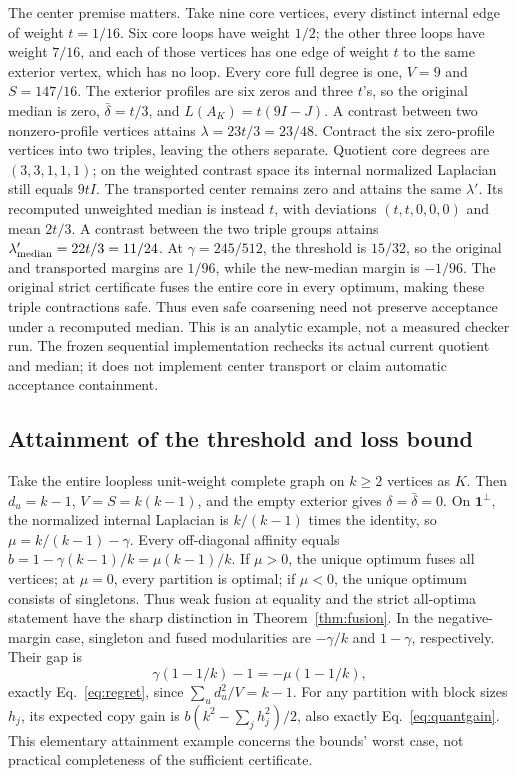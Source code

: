 \documentclass[sigconf,anonymous,review]{acmart}
\newcommand{\1}{\mathbf{1}}
\begin{document}
The center premise matters. Take nine core vertices, every distinct internal
edge of weight $t=1/16$. Six core loops have weight $1/2$; the other three
loops have weight $7/16$, and each of those vertices has one edge of weight $t$
to the same exterior vertex, which has no loop. Every core full degree is one,
$V=9$ and $S=147/16$. The exterior profiles are six zeros and three $t$'s,
so the original median is zero, $\bar\delta=t/3$, and
$L(A_K)=t(9I-J)$. A contrast between two nonzero-profile vertices attains
$\lambda=23t/3=23/48$.
Contract the six zero-profile vertices into two triples, leaving the others
separate. Quotient core degrees are $(3,3,1,1,1)$; on the weighted contrast
space its internal normalized Laplacian still equals $9tI$.
The transported center remains zero and attains the same $\lambda'$.
Its recomputed unweighted median is instead $t$, with deviations
$(t,t,0,0,0)$ and mean $2t/3$. A contrast between the two triple groups
attains $\lambda'_{\rm median}=22t/3=11/24$.
At $\gamma=245/512$, the threshold is $15/32$, so the original and transported
margins are $1/96$, while the new-median margin is $-1/96$.
The original strict certificate fuses the entire core in every optimum, making
these triple contractions safe. Thus even safe coarsening need not preserve
acceptance under a recomputed median. This is an analytic example, not a
measured checker run. The frozen sequential implementation rechecks its actual
current quotient and median; it does not implement center transport or claim
automatic acceptance containment.

\subsection{Attainment of the threshold and loss bound}\label{app:sharpness}
Take the entire loopless unit-weight complete graph on $k\ge2$ vertices as $K$.
Then $d_u=k-1$, $V=S=k(k-1)$, and the empty exterior gives
$\delta=\bar\delta=0$. On $\1^\perp$, the normalized internal Laplacian
is $k/(k-1)$ times the identity, so $\mu=k/(k-1)-\gamma$.
Every off-diagonal affinity equals
$b=1-\gamma(k-1)/k=\mu(k-1)/k$.
If $\mu>0$, the unique optimum fuses all vertices; at $\mu=0$, every
partition is optimal; if $\mu<0$, the unique optimum consists of singletons.
Thus weak fusion at equality and the strict all-optima statement have the
sharp distinction in Theorem~\ref{thm:fusion}.
In the negative-margin case, singleton and fused modularities are
$-\gamma/k$ and $1-\gamma$, respectively. Their gap is
\[
 \gamma(1-1/k)-1=-\mu(1-1/k),
\]
exactly Eq.~\eqref{eq:regret}, since
$\sum_ud_u^2/V=k-1$.
For any partition with block sizes $h_j$, its expected copy gain is
$b(k^2-\sum_jh_j^2)/2$, also exactly Eq.~\eqref{eq:quantgain}.
This elementary attainment example concerns the bounds' worst case, not
practical completeness of the sufficient certificate.
\end{document}
